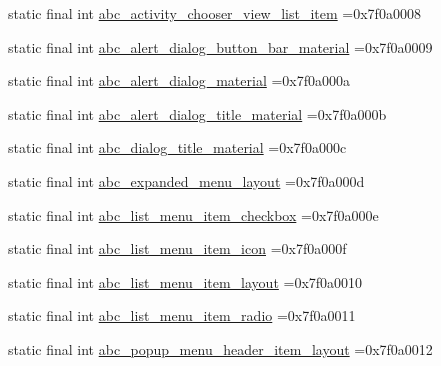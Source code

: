\begin{DoxyCompactItemize}
\item 
static final int \mbox{\hyperlink{classbr_1_1unb_1_1cic_1_1mp_1_1marketmaster_1_1R_1_1layout_a3d4136a87c9daf6841700b660b2c30c0}{abc\+\_\+activity\+\_\+chooser\+\_\+view\+\_\+list\+\_\+item}} =0x7f0a0008
\item 
static final int \mbox{\hyperlink{classbr_1_1unb_1_1cic_1_1mp_1_1marketmaster_1_1R_1_1layout_ad33dc5e0be8fdf7b7dd0b45697a9804b}{abc\+\_\+alert\+\_\+dialog\+\_\+button\+\_\+bar\+\_\+material}} =0x7f0a0009
\item 
static final int \mbox{\hyperlink{classbr_1_1unb_1_1cic_1_1mp_1_1marketmaster_1_1R_1_1layout_aa6d23252425ee17133fd1b22356ea3f3}{abc\+\_\+alert\+\_\+dialog\+\_\+material}} =0x7f0a000a
\item 
static final int \mbox{\hyperlink{classbr_1_1unb_1_1cic_1_1mp_1_1marketmaster_1_1R_1_1layout_a325bba3ce49ef4e93ea497eeb6f7bfc1}{abc\+\_\+alert\+\_\+dialog\+\_\+title\+\_\+material}} =0x7f0a000b
\item 
static final int \mbox{\hyperlink{classbr_1_1unb_1_1cic_1_1mp_1_1marketmaster_1_1R_1_1layout_a0af256bd3cd64dbbb10b629bd11167d4}{abc\+\_\+dialog\+\_\+title\+\_\+material}} =0x7f0a000c
\item 
static final int \mbox{\hyperlink{classbr_1_1unb_1_1cic_1_1mp_1_1marketmaster_1_1R_1_1layout_ad75bb5b100b128c79396a6494a263053}{abc\+\_\+expanded\+\_\+menu\+\_\+layout}} =0x7f0a000d
\item 
static final int \mbox{\hyperlink{classbr_1_1unb_1_1cic_1_1mp_1_1marketmaster_1_1R_1_1layout_ab83aaa18f48af1a8081bdfdd21ee1362}{abc\+\_\+list\+\_\+menu\+\_\+item\+\_\+checkbox}} =0x7f0a000e
\item 
static final int \mbox{\hyperlink{classbr_1_1unb_1_1cic_1_1mp_1_1marketmaster_1_1R_1_1layout_a7a784c0efc9834a7c88ec680a94ef0a3}{abc\+\_\+list\+\_\+menu\+\_\+item\+\_\+icon}} =0x7f0a000f
\item 
static final int \mbox{\hyperlink{classbr_1_1unb_1_1cic_1_1mp_1_1marketmaster_1_1R_1_1layout_a63937416b3d216f3d2de2f686bb22790}{abc\+\_\+list\+\_\+menu\+\_\+item\+\_\+layout}} =0x7f0a0010
\item 
static final int \mbox{\hyperlink{classbr_1_1unb_1_1cic_1_1mp_1_1marketmaster_1_1R_1_1layout_aa4e51198a9754afa64c8faf8fa70e122}{abc\+\_\+list\+\_\+menu\+\_\+item\+\_\+radio}} =0x7f0a0011
\item 
static final int \mbox{\hyperlink{classbr_1_1unb_1_1cic_1_1mp_1_1marketmaster_1_1R_1_1layout_aa4a9782951453f527dd7cdcf934aa911}{abc\+\_\+popup\+\_\+menu\+\_\+header\+\_\+item\+\_\+layout}} =0x7f0a0012

\end{DoxyCompactItemize}

